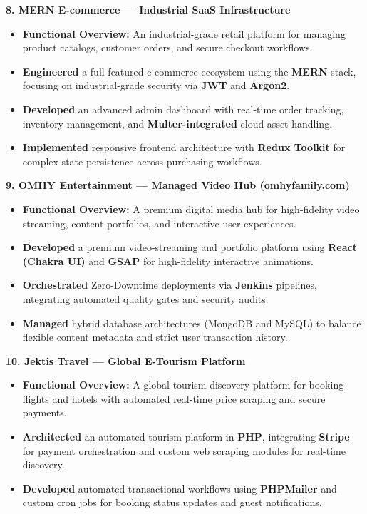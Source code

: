 \documentclass[10pt, letterpaper]{article}
\newenvironment{highlights}{
\begin{itemize}[leftmargin=12pt, itemsep=2pt]
}{
\end{itemize}
}
\begin{document}
\textbf{8. MERN E-commerce --- Industrial SaaS Infrastructure}
\begin{highlights}
\item \textbf{Functional Overview:} An industrial-grade retail platform for managing product catalogs, customer orders, and secure checkout workflows.
\item \textbf{Engineered} a full-featured e-commerce ecosystem using the \textbf{MERN} stack, focusing on industrial-grade security via \textbf{JWT} and \textbf{Argon2}.
\item \textbf{Developed} an advanced admin dashboard with real-time order tracking, inventory management, and \textbf{Multer-integrated} cloud asset handling.
\item \textbf{Implemented} responsive frontend architecture with \textbf{Redux Toolkit} for complex state persistence across purchasing workflows.
\end{highlights}

\textbf{9. OMHY Entertainment --- Managed Video Hub (\href{https://www.omhyfamily.com/}{omhyfamily.com})}
\begin{highlights}
\item \textbf{Functional Overview:} A premium digital media hub for high-fidelity video streaming, content portfolios, and interactive user experiences.
\item \textbf{Developed} a premium video-streaming and portfolio platform using \textbf{React (Chakra UI)} and \textbf{GSAP} for high-fidelity interactive animations.
\item \textbf{Orchestrated} Zero-Downtime deployments via \textbf{Jenkins} pipelines, integrating automated quality gates and security audits.
\item \textbf{Managed} hybrid database architectures (MongoDB and MySQL) to balance flexible content metadata and strict user transaction history.
\end{highlights}

\textbf{10. Jektis Travel --- Global E-Tourism Platform}
\begin{highlights}
\item \textbf{Functional Overview:} A global tourism discovery platform for booking flights and hotels with automated real-time price scraping and secure payments.
\item \textbf{Architected} an automated tourism platform in \textbf{PHP}, integrating \textbf{Stripe} for payment orchestration and custom web scraping modules for real-time discovery.
\item \textbf{Developed} automated transactional workflows using \textbf{PHPMailer} and custom cron jobs for booking status updates and guest notifications.
\end{highlights}
\end{document}
